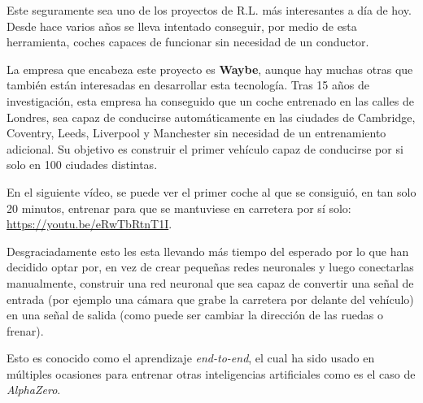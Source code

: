 Este seguramente sea uno de los proyectos de R.L. más interesantes a día de hoy. Desde hace varios años se lleva intentado conseguir, por medio de esta herramienta, coches capaces de funcionar sin necesidad de un conductor.

La empresa que encabeza este proyecto es \textbf{Waybe}\cite{Wayve}, aunque hay muchas otras que también están interesadas en desarrollar esta tecnología. Tras 15 años de investigación, esta empresa ha conseguido que un coche entrenado en las calles de Londres, sea capaz de conducirse automáticamente en las ciudades de Cambridge, Coventry, Leeds, Liverpool y Manchester sin necesidad de un entrenamiento adicional. Su objetivo es construir el primer vehículo capaz de conducirse por si solo en 100 ciudades distintas.

En el siguiente vídeo, se puede ver el primer coche al que se consiguió, en tan solo 20 minutos, entrenar para que se mantuviese en carretera por sí solo:
\href{https://youtu.be/eRwTbRtnT1I}{https://youtu.be/eRwTbRtnT1I}.

Desgraciadamente esto les esta llevando más tiempo del esperado por lo que han decidido optar por, en vez de crear pequeñas redes neuronales y luego conectarlas manualmente, construir una red neuronal que sea capaz de convertir una señal de entrada (por ejemplo una cámara que grabe la carretera por delante del vehículo) en una señal de salida (como puede ser cambiar la dirección de las ruedas o frenar).

Esto es conocido como el aprendizaje \textit{end-to-end}\cite{end_to_end}, el cual ha sido usado en múltiples ocasiones para entrenar otras inteligencias artificiales como es el caso de \textit{AlphaZero}\cite{AlphaZero}.
